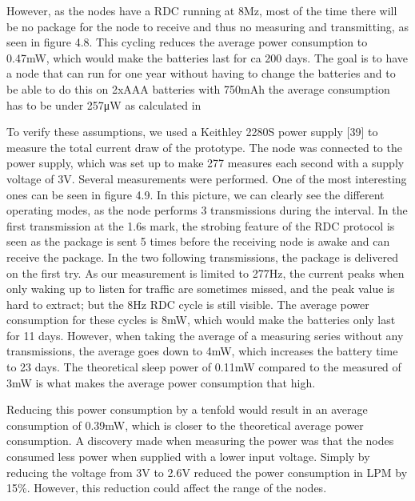 However,
	as the nodes have a RDC running at 8Mz,
	most of the time there will be no package for the node to receive and thus no measuring and transmitting,
	as seen in figure 4.8.
This cycling reduces the average power consumption to 0.47mW,
	which would make the batteries last for ca 200 days.
The goal is to have a node that can run for one year without having to change the batteries and to be able to do this on 2xAAA batteries with 750mAh the average consumption has to be under 257μW as calculated in 

To verify these assumptions,
	we used a Keithley 2280S power supply [39] to measure the total current draw of the prototype.
The node was connected to the power supply,
	which was set up to make 277 measures each second with a supply voltage of 3V.
Several measurements were performed.
One of the most interesting ones can be seen in figure 4.9.
In this picture,
	we can clearly see the different operating modes,
	as the node performs 3 transmissions during the interval.
In the first transmission at the 1.6s mark,
	the strobing feature of the RDC protocol is seen as the package is sent 5 times before the receiving node is awake and can receive the package.
In the two following transmissions,
	the package is delivered on the first try.
As our measurement is limited to 277Hz,
	the current peaks when only waking up to listen for traffic are sometimes missed,
	and the peak value is hard to extract;
	but the 8Hz RDC cycle is still visible.
The average power consumption for these cycles is 8mW,
	which would make the batteries only last for 11 days.
However,
	when taking the average of a measuring series without any transmissions,
	the average goes down to 4mW,
	which increases the battery time to 23 days.
The theoretical sleep power of 0.11mW compared to the measured of 3mW is what makes the average power consumption that high.

Reducing this power consumption by a tenfold would result in an average consumption of 0.39mW,
	which is closer to the theoretical average power consumption.
A discovery made when measuring the power was that the nodes consumed less power when supplied with a lower input voltage.
Simply by reducing the voltage from 3V to 2.6V reduced the power consumption in LPM by 15\%.
However,
	this reduction could affect the range of the nodes.


